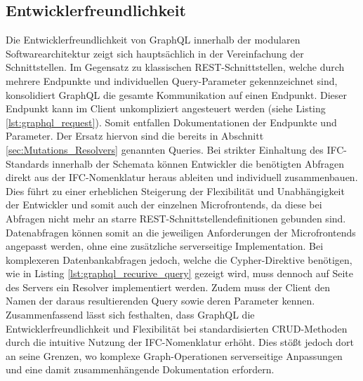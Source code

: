 \subsection{Entwicklerfreundlichkeit} \label{sec:dx}
Die Entwicklerfreundlichkeit von GraphQL innerhalb der modularen Softwarearchitektur zeigt sich hauptsächlich in der Vereinfachung der Schnittstellen. Im Gegensatz zu klassischen REST-Schnittstellen, welche durch mehrere Endpunkte und individuellen Query-Parameter gekennzeichnet sind, konsolidiert GraphQL die gesamte Kommunikation auf einen Endpunkt. Dieser Endpunkt kann im Client unkompliziert angesteuert werden (siehe Listing \ref{lst:graphql_request}). Somit entfallen Dokumentationen der Endpunkte und Parameter. Der Ersatz hiervon sind die bereits in Abschnitt \ref{sec:Mutations_Resolvers} genannten Queries. Bei strikter Einhaltung des IFC-Standards innerhalb der Schemata können Entwickler die benötigten Abfragen direkt aus der IFC-Nomenklatur heraus ableiten und individuell zusammenbauen. Dies führt zu einer erheblichen Steigerung der Flexibilität und Unabhängigkeit der Entwickler und somit auch der einzelnen Microfrontends, da diese bei Abfragen nicht mehr an starre REST-Schnittstellendefinitionen gebunden sind. Datenabfragen können somit an die jeweiligen Anforderungen der Microfrontends angepasst werden, ohne eine zusätzliche serverseitige Implementation. Bei komplexeren Datenbankabfragen jedoch, welche die Cypher-Direktive benötigen, wie in Listing \ref{lst:graphql_recurive_query} gezeigt wird, muss dennoch auf Seite des Servers ein Resolver implementiert werden. Zudem muss der Client den Namen der daraus resultierenden Query sowie deren Parameter kennen.
Zusammenfassend lässt sich festhalten, dass GraphQL die Entwicklerfreundlichkeit und Flexibilität bei standardisierten CRUD-Methoden durch die intuitive Nutzung der IFC-Nomenklatur erhöht. Dies stößt jedoch dort an seine Grenzen, wo komplexe Graph-Operationen serverseitige Anpassungen und eine damit zusammenhängende Dokumentation erfordern.

